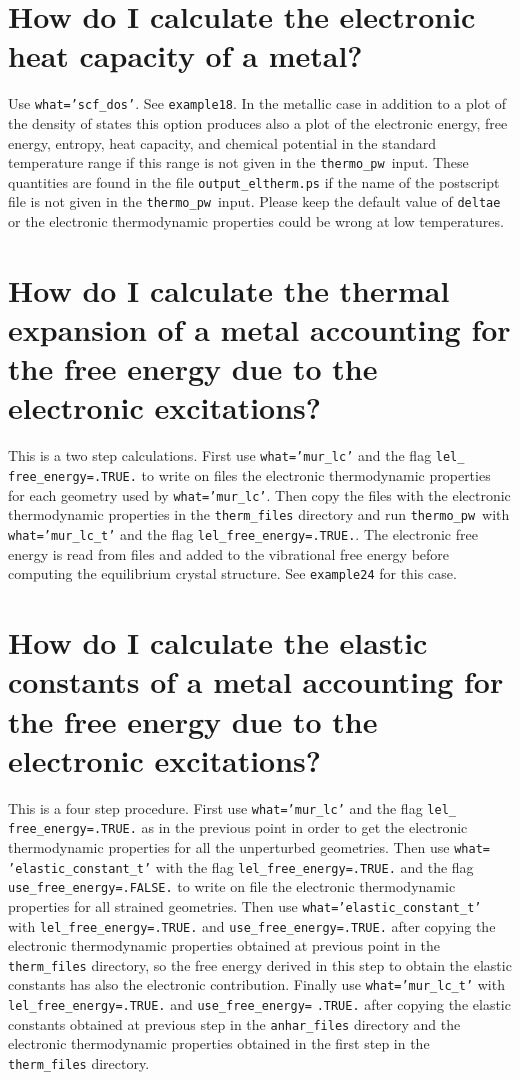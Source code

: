 \documentclass[12pt,a4paper]{article}
\def\thermo{\texttt{thermo\_pw}}
\begin{document}
\newpage
\section{\color{coral}How do I calculate the electronic heat capacity
of a metal?}
Use \texttt{what='scf\_dos'}. See \texttt{example18}. In the metallic
case in addition to a plot of the density of states this option produces
also a plot of the electronic energy, free energy, entropy, heat capacity,
and chemical potential in the standard temperature range if this range is
not given in the \thermo\ input. These quantities are found in the file
\texttt{output\_eltherm.ps} if the name of the postscript
file is not given in the \thermo\ input.
Please keep the default value of \texttt{deltae} or the electronic
thermodynamic properties could be wrong at low temperatures.

\newpage
\section{\color{coral}How do I calculate the thermal expansion of a metal
accounting for the free energy due to the electronic excitations?}
This is a two step calculations. First use \texttt{what='mur\_lc'} and
the flag \texttt{lel\_} \texttt{free\_energy=.TRUE.} to write on files the
electronic thermodynamic properties for each geometry used by
\texttt{what='mur\_lc'}. Then copy the files with
the electronic thermodynamic properties in the  
\texttt{therm\_files} directory and run \thermo\ with \texttt{what='mur\_lc\_t'}
and the flag \texttt{lel\_free\_energy=.TRUE.}. The electronic free energy
is read from files and added to the vibrational free energy before computing
the equilibrium crystal structure.
See \texttt{example24} for this case. 

\newpage
\section{\color{coral}How do I calculate the elastic constants of a metal
accounting for the free energy due to the electronic excitations?}
This is a four step procedure. First use \texttt{what='mur\_lc'} and
the flag \texttt{lel\_} \texttt{free\_energy=.TRUE.} as in the previous point
in order to get the electronic thermodynamic properties for all the 
unperturbed geometries. Then use \texttt{what=} \texttt{'elastic\_constant\_t'}
with the flag \texttt{lel\_free\_energy=.TRUE.} and the flag
\texttt{use\_free\_energy=.FALSE.} to write on file the electronic
thermodynamic properties for all strained geometries. Then use
\texttt{what='elastic\_constant\_t'} with \texttt{lel\_free\_energy=.TRUE.}
and \texttt{use\_free\_energy=.TRUE.} after copying the electronic
thermodynamic properties obtained at previous point in the 
\texttt{therm\_files} directory, so the 
free energy derived in this step to obtain the elastic constants 
has also the electronic contribution. 
Finally use \texttt{what='mur\_lc\_t'} with \texttt{lel\_free\_energy=.TRUE.}
and \texttt{use\_free\_energy=} \texttt{.TRUE.} after copying the elastic
constants obtained at previous step in the \texttt{anhar\_files} directory
and the electronic thermodynamic properties obtained in the first 
step in the \texttt{therm\_files} directory.
\end{document}
